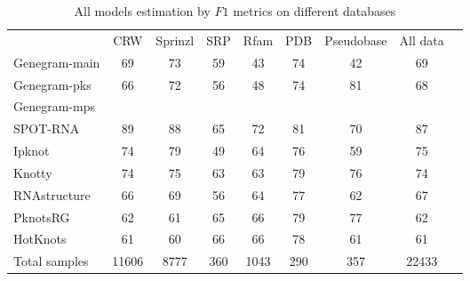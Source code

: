 \begin{table}
\centering
\caption{All models estimation by $F1$ metrics on different databases}
\begin{tabular}{@{}lcccccccc@{}}\toprule
& CRW & Sprinzl & SRP & Rfam & PDB & Pseudobase  & All data \\ \cmidrule{2-8} 
Genegram-main  & 69 & 73 & 59 & 43 & 74 & 42 & 69 \\
Genegram-pks  & 66 & 72 & 56 & 48 & 74 & 81 & 68 \\
Genegram-mps  &  &  &  &  &  &  &  \\
SPOT-RNA & 89 & 88 & 65 & 72 & 81 & 70 & 87 \\
Ipknot & 74 & 79 & 49 & 64 & 76 & 59 & 75 \\
Knotty & 74 & 75 & 63 & 63 & 79 & 76 & 74 \\
RNAstructure & 66 & 69 & 56 & 64 & 77 & 62 & 67 \\
PknotsRG & 62 & 61 & 65 & 66 & 79 & 77 & 62 \\
HotKnots & 61 & 60 & 66 & 66 & 78 & 61 & 61 \\
\bottomrule
Total samples & 11606 & 8777 & 360 & 1043 & 290 & 357 & 22433 \\
\bottomrule
\end{tabular}
\label{table_all}
\end{table}
